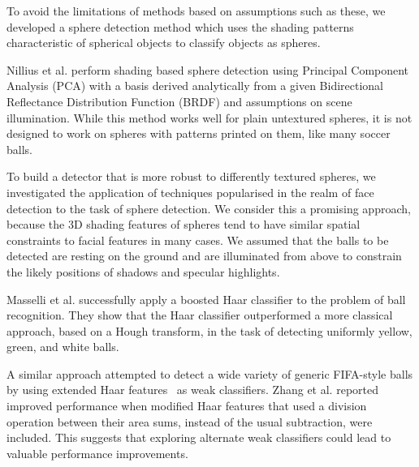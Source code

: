 \documentclass{sig-alternate-05-2015}
\newcommand{\citep}[1]{\cite{#1}}
\newcommand{\citet}[1]{\cite{#1}}
\begin{document}
{		To avoid the limitations of methods based on assumptions such as these, we developed a sphere detection method which uses the shading patterns characteristic of spherical objects to classify objects as spheres.

		Nillius et al. \citet{nillius2008shading} perform shading based sphere detection using Principal Component Analysis (PCA) with a basis derived analytically from a given Bidirectional Reflectance Distribution Function (BRDF) and assumptions on scene illumination. While this method works well for plain untextured spheres, it is
		not designed to work on spheres with patterns printed on them, like many soccer balls.
		
		
		
		
		


		To build a detector that is more robust to differently textured spheres, we investigated the application of techniques popularised in the realm of face detection to the task of sphere detection. We consider this a promising approach, because the 3D shading features of spheres tend to have similar spatial constraints to facial features in many cases. We assumed that the balls to be detected are resting on the ground and are illuminated from above to constrain the likely positions of shadows and specular highlights.



		Masselli et al. \citet{masselli2013haar} successfully apply a boosted Haar classifier \citep{viola2001robust} to the problem of ball recognition. They show that the Haar classifier outperformed a more classical approach, based on a Hough transform, in the task of detecting uniformly yellow, green, and white balls.

		A similar approach	\citet{zhang2013novel} attempted to detect a wide variety of generic FIFA-style balls by using extended Haar features~\citep{Lienhart2002extended} as weak classifiers. Zhang et al. \citet{zhang2013novel} reported improved performance when modified Haar features that used a division operation between their area sums, instead of the usual subtraction, were included. This suggests that exploring alternate weak classifiers could lead to valuable performance improvements.

}
\end{document}
